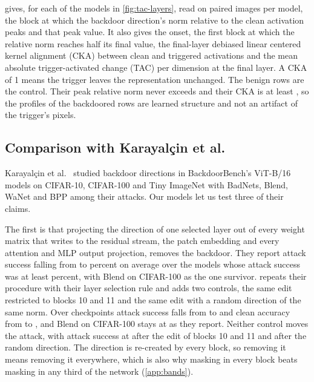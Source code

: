  gives, for each of the \TacLayersCheckpoints{} models in \cref{fig:tac-layers}, read on \TacLayersSamples{} paired images per model, the block at which the backdoor direction's norm relative to the clean activation peaks and that peak value. It also gives the onset, the first block at which the relative norm reaches half its final value, the final-layer debiased linear centered kernel alignment (CKA) \cite{kornblith2019cka,nguyen2021wide} between clean and triggered activations and the mean absolute trigger-activated change (TAC) per dimension at the final layer. A CKA of 1 means the trigger leaves the representation unchanged. The benign rows are the control. Their peak relative norm never exceeds \TacLayersBenignPeakMax{} and their CKA is at least \TacLayersBenignCkaMin{}, so the profiles of the backdoored rows are learned structure and not an artifact of the trigger's pixels.


\FloatBarrier

\subsection{Comparison with Karayal\c{c}in et al.}
\label{sec:mechanism:picek}\label{app:picek}

Karayal\c{c}in et al.~\cite{karayalcin2026backdoor} studied backdoor directions in BackdoorBench's ViT-B/16 models on CIFAR-10, CIFAR-100 and Tiny ImageNet with BadNets, Blend, WaNet and BPP among their attacks. Our models let us test three of their claims.

The first is that projecting the direction of one selected layer out of every weight matrix that writes to the residual stream, the patch embedding and every attention and MLP output projection, removes the backdoor. They report attack success falling from  to  percent on average over the  models whose attack success was at least  percent, with Blend on CIFAR-100 as the one survivor.  repeats their procedure with their layer selection rule and adds two controls, the same edit restricted to blocks 10 and 11 and the same edit with a random direction of the same norm. Over \ErasureCheckpoints{} checkpoints attack success falls from \ErasureAsrBeforeMean{} to \ErasureAsrAfterAllWritesMean{} and clean accuracy from \ErasureCaBeforeMean{} to \ErasureCaAfterAllWritesMean{}, and Blend on CIFAR-100 stays at \ErasureAsrAfterAllWritesMax{} as they report. Neither control moves the attack, with attack success at \ErasureAsrAfterBlocksOneZeroOneOneMean{} after the edit of blocks 10 and 11 and \ErasureAsrAfterRandomDirectionMean{} after the random direction. The direction is re-created by every block, so removing it means removing it everywhere, which is also why masking in every block beats masking in any third of the network (\cref{app:bands}).

